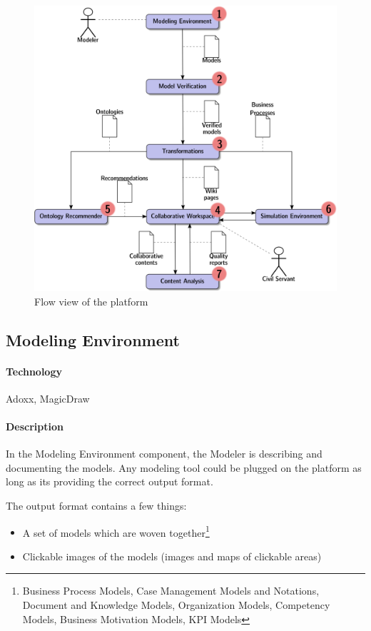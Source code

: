\documentclass{learnpad}
\begin{document}
\begin{figure}[!htp]
	\centering
	\includegraphics[width=.6\paperwidth,keepaspectratio]{figures/logical-view.png}
	\caption{Flow view of the \learnpad platform}
	\label{fig:flow-view}
\end{figure}

\subsection{Modeling Environment}
\label{sec:modeling-environment}

\paragraph{Technology}
Adoxx, MagicDraw

\paragraph{Description}
In the Modeling Environment component, the Modeler is describing and documenting
the models.  Any modeling tool could be plugged on the \learnpad platform as
long as its providing the correct output format.

The output format contains a few things:
\begin{itemize}
	\item A set of models which are woven together\footnote{Business Process
		Models, Case Management Models and Notations, Document and Knowledge
		Models, Organization Models, Competency Models, Business Motivation
		Models, KPI Models}
	\item Clickable images of the models (images and maps of clickable areas)
\end{itemize}
\end{document}

